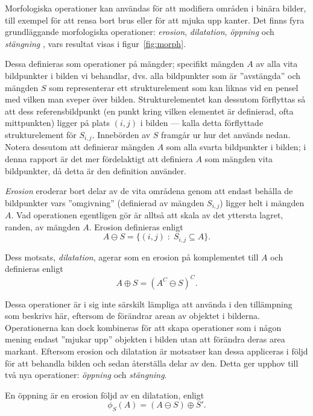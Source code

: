 \documentclass[../rapport_MVEX01-11-05]{subfiles}
\begin{document}
Morfologiska operationer kan användas för att modifiera områden i
binära bilder, till exempel för att rensa bort brus eller för att
mjuka upp kanter. Det finns fyra grundläggande morfologiska
operationer: \emph{erosion}, \emph{dilatation}, \emph{öppning} och
\emph{stängning} \cite[s.~25]{Rudemo09}, vars resultat visas i figur~\ref{fig:morph}.

Dessa definieras som operationer på mängder; specifikt mängden $A$
av alla vita bildpunkter i bilden vi behandlar, dvs. alla bildpunkter som är
''avstängda'' och mängden $S$ som representerar ett strukturelement
som kan liknas vid en pensel med vilken man sveper över bilden.
Strukturelementet kan dessutom förflyttas så att dess
referensbildpunkt (en punkt kring vilken elementet är definierad, ofta
mittpunkten)
ligger på plats $(i,j)$ i bilden --- kalla detta förflyttade
strukturelement för $S_{i,j}$. Innebörden av $S$ framgår ur hur det används
nedan.
Notera dessutom att  definierar mängden
$A$ som alla svarta bildpunkter i bilden; i denna rapport är det mer
fördelaktigt att definiera $A$ som mängden vita bildpunkter, då detta
är den definition \MATLAB använder.

\emph{Erosion} eroderar bort delar av de vita områdena genom
att endast behålla de bildpunkter vars ''omgivning'' (definierad av mängden
$S_{i,j}$) ligger helt i mängden $A$. Vad operationen egentligen gör är alltså
att skala av det yttersta lagret, randen, av mängden $A$. Erosion definieras enligt
\begin{equation*}
  A\ominus S = \{(i,j)\;:\;S_{i,j}\subseteq A\}.
\end{equation*}

Dess motsats, \emph{dilatation}, agerar som
en erosion på komplementet till $A$ och definieras enligt
\begin{equation*}
  A\oplus S = (A^C\ominus S)^C.
\end{equation*}

Dessa operationer är i sig inte särskilt lämpliga att använda i den
tillämpning som beskrivs här, eftersom de förändrar
arean av objektet i bilderna. Operationerna kan dock kombineras för
att skapa operationer som i någon mening endast 
''mjukar upp'' objekten i bilden utan att förändra deras area markant.
Eftersom erosion och dilatation är motsatser kan dessa appliceras i
följd för att behandla bilden och
sedan återställa delar av den. Detta ger upphov till två nya operationer:
\emph{öppning} och \emph{stängning}.

En öppning är en erosion följd av en dilatation, enligt
\begin{equation*}
  \phi_S(A)=(A\ominus S)\oplus S'.
\end{equation*}
\end{document}
